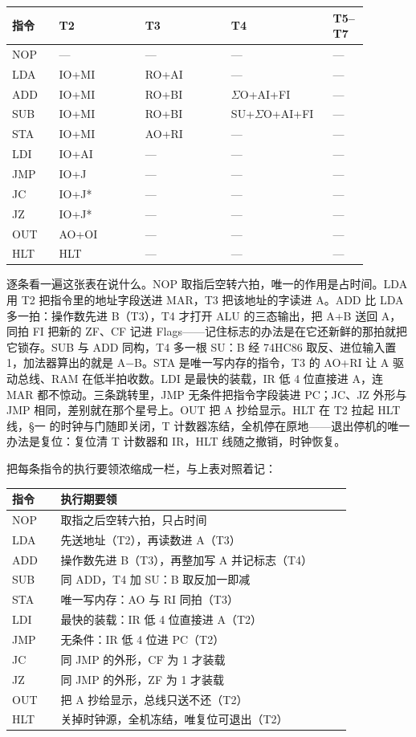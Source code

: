 \begin{longtable}{L{0.12\linewidth}L{0.22\linewidth}L{0.22\linewidth}L{0.26\linewidth}L{0.06\linewidth}}
\toprule
指令 & T2 & T3 & T4 & T5–T7 \\
\midrule
NOP & — & — & — & — \\
LDA & IO+MI & RO+AI & — & — \\
ADD & IO+MI & RO+BI & $\Sigma$O+AI+FI & — \\
SUB & IO+MI & RO+BI & SU+$\Sigma$O+AI+FI & — \\
STA & IO+MI & AO+RI & — & — \\
LDI & IO+AI & — & — & — \\
JMP & IO+J & — & — & — \\
JC & IO+J* & — & — & — \\
JZ & IO+J* & — & — & — \\
OUT & AO+OI & — & — & — \\
HLT & HLT & — & — & — \\
\bottomrule
\end{longtable}

逐条看一遍这张表在说什么。NOP 取指后空转六拍，唯一的作用是占时间。LDA 用 T2 把指令里的地址字段送进 MAR，T3 把该地址的字读进 A。ADD 比 LDA 多一拍：操作数先进 B（T3），T4 才打开 ALU 的三态输出，把 A+B 送回 A，同拍 FI 把新的 ZF、CF 记进 Flags——记住标志的办法是在它还新鲜的那拍就把它锁存。SUB 与 ADD 同构，T4 多一根 SU：B 经 74HC86 取反、进位输入置 1，加法器算出的就是 A−B。STA 是唯一写内存的指令，T3 的 AO+RI 让 A 驱动总线、RAM 在低半拍收数。LDI 是最快的装载，IR 低 4 位直接进 A，连 MAR 都不惊动。三条跳转里，JMP 无条件把指令字段装进 PC；JC、JZ 外形与 JMP 相同，差别就在那个星号上。OUT 把 A 抄给显示。HLT 在 T2 拉起 HLT 线，§一 的时钟与门随即关闭，T 计数器冻结，全机停在原地——退出停机的唯一办法是复位：复位清 T 计数器和 IR，HLT 线随之撤销，时钟恢复。

把每条指令的执行要领浓缩成一栏，与上表对照着记：

\begin{longtable}{L{0.12\linewidth}L{0.72\linewidth}}
\toprule
指令 & 执行期要领 \\
\midrule
NOP & 取指之后空转六拍，只占时间 \\
LDA & 先送地址（T2），再读数进 A（T3） \\
ADD & 操作数先进 B（T3），再整加写 A 并记标志（T4） \\
SUB & 同 ADD，T4 加 SU：B 取反加一即减 \\
STA & 唯一写内存：AO 与 RI 同拍（T3） \\
LDI & 最快的装载：IR 低 4 位直接进 A（T2） \\
JMP & 无条件：IR 低 4 位进 PC（T2） \\
JC & 同 JMP 的外形，CF 为 1 才装载 \\
JZ & 同 JMP 的外形，ZF 为 1 才装载 \\
OUT & 把 A 抄给显示，总线只送不还（T2） \\
HLT & 关掉时钟源，全机冻结，唯复位可退出（T2） \\
\bottomrule
\end{longtable}

